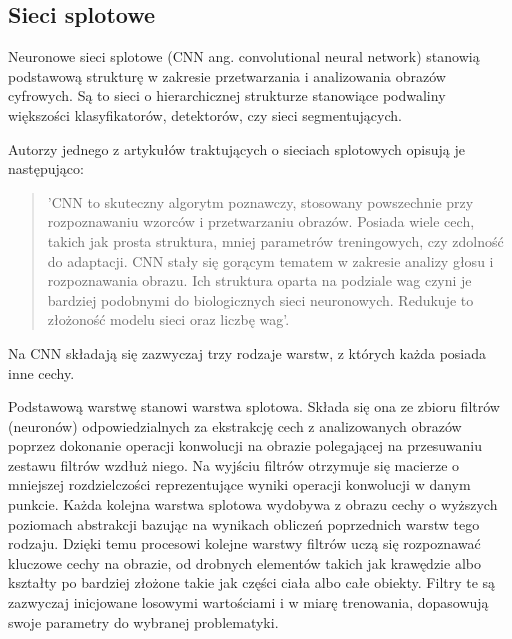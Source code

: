 
  \subsection{Sieci splotowe}
    \label{sieci_splotowe}

    Neuronowe sieci splotowe (CNN ang. convolutional neural network) stanowią podstawową strukturę w zakresie przetwarzania i analizowania obrazów cyfrowych. Są to sieci o hierarchicznej strukturze stanowiące podwaliny większości klasyfikatorów, detektorów, czy sieci segmentujących.

    Autorzy jednego z artykułów traktujących o sieciach splotowych \cite{cnn} opisują je następująco:
    \begin{quote}
      'CNN to skuteczny algorytm poznawczy, stosowany powszechnie przy rozpoznawaniu wzorców i przetwarzaniu obrazów. Posiada wiele cech, takich jak prosta struktura, mniej parametrów treningowych, czy zdolność do adaptacji. CNN stały się gorącym tematem w zakresie analizy głosu i rozpoznawania obrazu. Ich struktura oparta na podziale wag czyni je bardziej podobnymi do biologicznych sieci neuronowych. Redukuje to złożoność modelu sieci oraz liczbę wag'.
    \end{quote}

    \noindent
    Na CNN składają się zazwyczaj trzy rodzaje warstw, z których każda posiada inne cechy.

    Podstawową warstwę stanowi warstwa splotowa. Składa się ona ze zbioru filtrów (neuronów) odpowiedzialnych za ekstrakcję cech z analizowanych obrazów poprzez dokonanie operacji
    konwolucji na obrazie polegającej na przesuwaniu zestawu filtrów wzdłuż niego.
    Na wyjściu filtrów otrzymuje się macierze o mniejszej rozdzielczości
    reprezentujące wyniki operacji konwolucji w danym punkcie. Każda kolejna warstwa splotowa wydobywa z obrazu cechy o wyższych poziomach abstrakcji
    bazując na wynikach obliczeń poprzednich warstw tego rodzaju. Dzięki temu
    procesowi kolejne warstwy filtrów uczą się
    rozpoznawać kluczowe cechy na obrazie, od drobnych elementów takich jak
    krawędzie albo kształty po bardziej złożone takie jak części ciała albo
    całe obiekty. Filtry te są zazwyczaj inicjowane losowymi wartościami i w miarę trenowania, dopasowują swoje parametry do wybranej problematyki.

